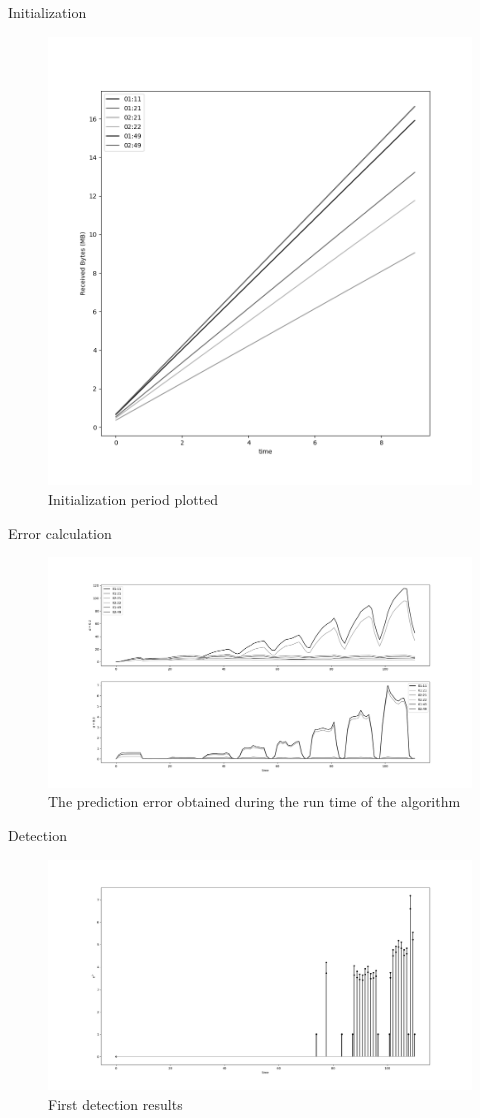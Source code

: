 \documentclass{beamer}
\begin{document}
\begin{frame}{Initialization}
    \begin{figure}
        \includegraphics[width=.5\textwidth]{meter_eleph/init_period_lin}
        \caption{Initialization period plotted}
    \end{figure}
\end{frame}

\begin{frame}{Error calculation}
    \begin{figure}
        \includegraphics[width=1\textwidth]{meter_eleph/error_plot_sse}
        \caption{The prediction error obtained during the run time of the algorithm}
    \end{figure}
\end{frame}

\begin{frame}{Detection}
    \begin{figure}
        \includegraphics[width=1\textwidth]{meter_eleph/detect_dumb}
        \caption{First detection results}
    \end{figure}
\end{frame}
\end{document}
